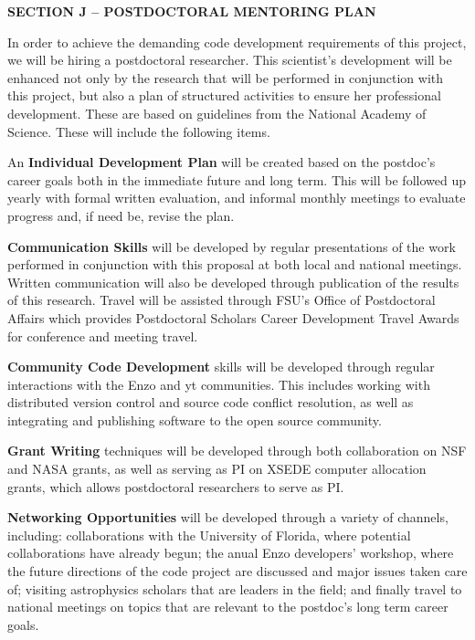 \documentclass[11pt]{article}
\begin{document}
\vspace{-6mm}
\begin{center}
  \bfseries\uppercase{Section J -- postdoctoral mentoring plan}
\end{center}
\vspace{-2mm}


In order to achieve the demanding code development requirements of this project,
we will be hiring a postdoctoral researcher.
This scientist's  development will be enhanced not only by the research that will be
performed in conjunction with this project, but also a plan of structured
activities to ensure her professional development.  These are based on
guidelines from the National Academy of Science. These will include the
following items.

\medskip
\noindent An \textbf{Individual Development Plan} will be created based on
the postdoc's career goals both in the immediate future and long term.  
This
will be followed up yearly with formal written evaluation, and informal monthly
meetings to evaluate progress and, if need be, revise the plan.

\medskip
\noindent \textbf{Communication Skills} will be developed by regular
presentations of the work performed in conjunction with this proposal at both
local and national meetings.  Written communication will also be developed
through publication of the results of this research.  Travel will be assisted
through FSU's Office of
Postdoctoral Affairs which provides Postdoctoral Scholars Career Development Travel
Awards for conference and meeting travel.  

\medskip
\noindent \textbf{Community Code Development} skills will be developed through
regular interactions with the Enzo and yt communities.  This includes working
with distributed version control and source code conflict resolution, as well as
integrating and publishing software to the open source community.

\medskip
\noindent \textbf{Grant Writing} techniques will be developed through both
collaboration on NSF and NASA grants, as well as serving as PI on XSEDE computer
allocation grants, which allows postdoctoral researchers to serve as PI.

\medskip
\noindent \textbf{Networking Opportunities} will be developed through a variety
of channels, including:
collaborations with the University of Florida, where potential collaborations
have already begun; the anual Enzo developers' workshop, where the future
directions of the code project are discussed and major issues taken care of;
visiting astrophysics scholars that are leaders in the field; and finally travel
to national meetings on topics that are relevant to the postdoc's long term
career goals.
\end{document}
